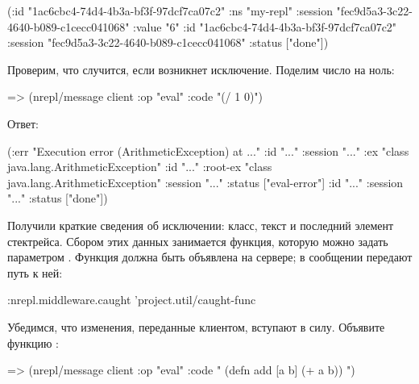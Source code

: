 \begin{english}
  \begin{clojure}
({:id "1ac6cbc4-74d4-4b3a-bf3f-97dcf7ca07c2"
  :ns "my-repl"
  :session "fec9d5a3-3c22-4640-b089-c1cecc041068"
  :value "6"}
 {:id "1ac6cbc4-74d4-4b3a-bf3f-97dcf7ca07c2"
  :session "fec9d5a3-3c22-4640-b089-c1cecc041068"
  :status ["done"]})
  \end{clojure}
\end{english}

Проверим, что случится, если возникнет исключение. Поделим число на ноль:

\begin{english}
  \begin{clojure}
=> (nrepl/message client {:op "eval" :code "(/ 1 0)"})
  \end{clojure}
\end{english}

Ответ:

\begin{english}
  \begin{clojure}
({:err "Execution error (ArithmeticException) at ..."
  :id "..."
  :session "..."}
 {:ex "class java.lang.ArithmeticException"
  :id "..."
  :root-ex "class java.lang.ArithmeticException"
  :session "..."
  :status ["eval-error"]}
 {:id "..."
  :session "..."
  :status ["done"]})
  \end{clojure}
\end{english}

Получили краткие сведения об исключении: класс, текст и последний элемент стектрейса. Сбором этих данных занимается функция, которую можно задать параметром . Функция должна быть объявлена на сервере; в сообщении передают путь к ней:

\begin{english}
  \begin{clojure}
{:nrepl.middleware.caught 'project.util/caught-func}
  \end{clojure}
\end{english}

Убедимся, что изменения, переданные клиентом, вступают в силу. Объявите функцию :

\begin{english}
  \begin{clojure}
=> (nrepl/message client {:op "eval" :code "
(defn add [a b]
  (+ a b))
"})
  \end{clojure}
\end{english}


